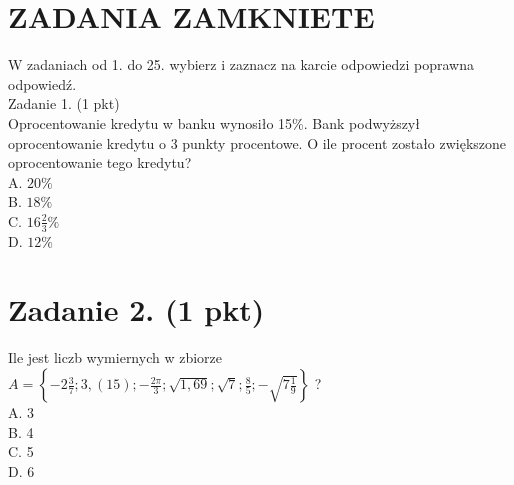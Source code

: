 \documentclass[10pt]{article}
\begin{document}
\section*{ZADANIA ZAMKNIETE}
W zadaniach od 1. do 25. wybierz i zaznacz na karcie odpowiedzi poprawna odpowiedź.\\
Zadanie 1. (1 pkt)\\
Oprocentowanie kredytu w banku wynosiło 15\%. Bank podwyższył oprocentowanie kredytu o 3 punkty procentowe. O ile procent zostało zwiększone oprocentowanie tego kredytu?\\
A. \(20 \%\)\\
B. \(18 \%\)\\
C. \(16 \frac{2}{3} \%\)\\
D. \(12 \%\)

\section*{Zadanie 2. (1 pkt)}
Ile jest liczb wymiernych w zbiorze \(A=\left\{-2 \frac{3}{7} ; 3,(15) ;-\frac{2 \pi}{3} ; \sqrt{1,69} ; \sqrt{7} ; \frac{8}{5} ;-\sqrt{7 \frac{1}{9}}\right\}\) ?\\
A. 3\\
B. 4\\
C. 5\\
D. 6
\end{document}
